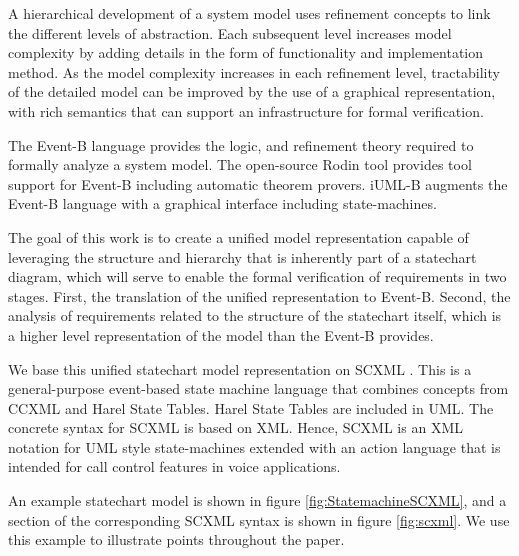 \documentclass{easychair}
\begin{document}
A hierarchical development of a system model uses 
refinement concepts to link the different levels
of abstraction. Each subsequent level increases model 
complexity by adding details in the form of functionality and 
implementation method. As the model complexity increases 
in each refinement level, tractability of the detailed 
model can be improved by the use of a graphical representation, 
with rich semantics that can support an infrastructure 
for formal verification.

The Event-B language \cite{abrial10:_model_event_b} provides the logic, and refinement
theory required to formally analyze a system model. 
The  open-source Rodin tool \cite{abrial10:_rodin} provides tool support for Event-B including automatic theorem provers.
iUML-B \cite{snook14:_b_statem} augments the Event-B language with a graphical interface including state-machines.
 
 The goal of this work is to create a unified model 
representation capable of leveraging the structure and 
hierarchy that is inherently part of a statechart 
diagram, which will serve to enable the formal verification
of requirements in two stages. First, 
the translation of the unified representation to Event-B. Second,
the analysis of requirements related to the structure of 
the statechart itself, which is a higher level representation 
of the model than the Event-B provides. 

We base this unified statechart model representation 
on SCXML  \cite{scxmlwebsite}.  This is a general-purpose event-based state machine 
language that combines concepts from CCXML and Harel 
State Tables. Harel State Tables are included in UML. 
The concrete syntax for SCXML
is based on XML. Hence, SCXML is an XML notation for 
UML style state-machines extended with an action 
language that is intended for call control features 
in voice applications.

An example statechart model is shown in figure  \ref{fig:StatemachineSCXML}, and a section of the corresponding SCXML syntax is shown in figure \ref{fig:scxml}. We use this example to illustrate points throughout the paper.
\end{document}
